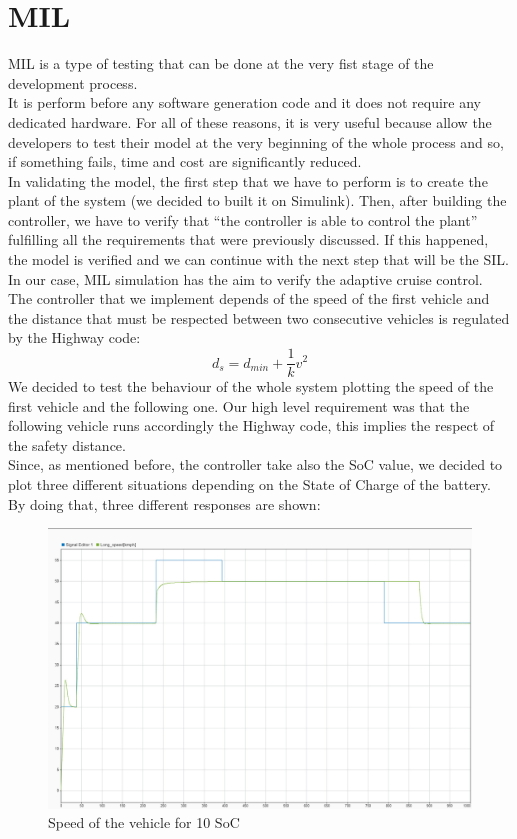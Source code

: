 \documentclass[12pt,a4paper]{report}
\begin{document}
\section{MIL}
MIL is a type of testing that can be done at the very fist stage of the development process.\\
It is perform before any software generation code and it does not require any dedicated hardware. For all of these reasons, it is very useful because allow the developers to test their model at the very beginning of the whole process and so, if something fails, time and cost are significantly reduced. \\
In validating the model, the first step that we have to perform is to create the plant of the system (we decided to built it on Simulink). Then, after building the controller, we have to verify that “the controller is able to control the plant” fulfilling all the requirements that were previously discussed. If this happened, the model is verified and we can continue with the next step that will be the SIL.\\
In our case, MIL simulation has the aim to verify the adaptive cruise control. \\
The controller that we implement depends of the speed of the first vehicle and the distance that must be respected between two consecutive vehicles is regulated by the Highway code:\\
\begin{equation*}
	d_s=d_{min}+\dfrac{1}{k}v^2
\end{equation*}
We decided to test the behaviour of the whole system plotting the speed of the first vehicle and the following one. Our high level requirement was that the following vehicle runs accordingly the Highway code, this implies the respect of the safety distance. \\
Since, as mentioned before, the controller take also the SoC value, we decided to plot three different situations depending on the State of Charge of the battery. By doing that, three different responses are shown:\\
\begin{figure}[htbp]
	\centering
	\includegraphics[scale=0.2]{10_soc.jpeg}
	\caption{Speed of the vehicle for 10 SoC}
\end{figure}
\end{document}

